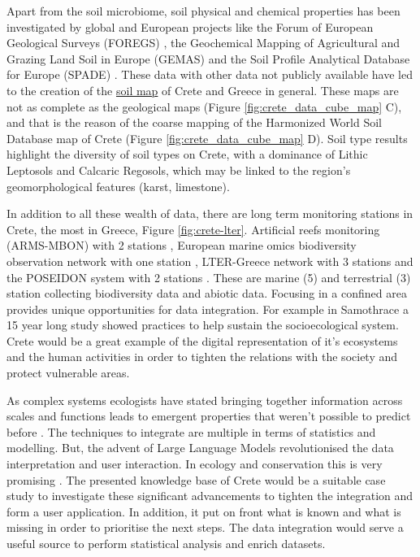 Apart from the soil microbiome, soil physical and chemical properties has been
investigated by global and European projects like the Forum of European Geological Surveys
(FOREGS) \parencite{nerc19017}, the Geochemical Mapping of Agricultural and Grazing Land
Soil in Europe (GEMAS) \parencite{REIMANN2018302} and the Soil Profile Analytical
Database for Europe (SPADE) \parencite{Hiederer2006}. These data with other data
not publicly available have led to the creation of the \href{https://esdac.jrc.ec.europa.eu/content/soil-map-greece-0}{soil map} of Crete 
and Greece in general. These maps are not as complete as the geological maps (Figure \ref{fig:crete_data_cube_map} C), 
and that is the reason of the coarse mapping of the Harmonized World Soil Database map of Crete (Figure \ref{fig:crete_data_cube_map} D).
Soil type results highlight the diversity of soil types on Crete, with a
dominance of Lithic Leptosols and Calcaric Regosols, which may be linked to the
region's geomorphological features (karst, limestone).

In addition to all these wealth of data, there are long term monitoring stations in 
Crete, the most in Greece, Figure \ref{fig:crete-lter}.
Artificial reefs monitoring (ARMS-MBON) with 2 stations \parencite{obst2020arms},
European marine omics biodiversity observation network with one station \parencite{santi2023emobon},
LTER-Greece network with 3 stations \parencite{Skoulikidis2021lter} and the POSEIDON system with 2 stations \parencite{ntoumas2022}. 
These are marine (5) and terrestrial (3) station collecting biodiversity data and abiotic data.
Focusing in a confined area provides unique opportunities for data integration.
For example in Samothrace \parencite{noll2024insights} a 15 year long study 
showed practices to help sustain the socioecological system.
Crete would be a great example of the digital representation of it's ecosystems
and the human activities in order to tighten the relations with the society and 
protect vulnerable areas.

As complex systems ecologists have stated bringing together information across
scales \parencite{brown2004METABOLIC} and functions leads to emergent properties that weren't possible to 
predict before \parencite{smith2016Origin}. The techniques to integrate are multiple in terms of statistics and modelling. But,
the advent of Large Language Models revolutionised the data interpretation and 
user interaction. In ecology and conservation this is very promising \parencite{doi2024biodiversity}.
The presented knowledge base of Crete would be a suitable 
case study to investigate these significant advancements to tighten the integration and form a 
user application. In addition, it put on front what is known and what is missing 
in order to prioritise the next steps. The data integration would serve a useful 
source to perform statistical analysis and enrich datasets.

